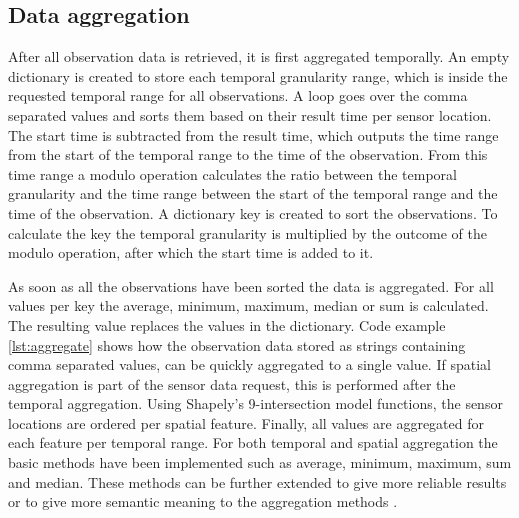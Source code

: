 \subsection{Data aggregation}
After all observation data is retrieved, it is first aggregated temporally. An empty dictionary is created to store each temporal granularity range, which is inside the requested temporal range for all observations. A loop goes over the comma separated values and sorts them based on their result time per sensor location. The start time is subtracted from the result time, which outputs the time range from the start of the temporal range to the time of the observation. From this time range a modulo operation calculates the ratio between the temporal granularity and the time range between the start of the temporal range and the time of the observation. A dictionary key is created to sort the observations. To calculate the key the temporal granularity is multiplied by the outcome of the modulo operation, after which the start time is added to it. 

As soon as all the observations have been sorted the data is aggregated. For all values per key the average, minimum, maximum, median or sum is calculated. The resulting value replaces the values in the dictionary. Code example \ref{lst:aggregate} shows how the observation data stored as strings containing comma separated values, can be quickly aggregated to a single value. If spatial aggregation is part of the sensor data request, this is performed after the temporal aggregation. Using Shapely's 9-intersection model functions, the sensor locations are ordered per spatial feature. Finally, all values are aggregated for each feature per temporal range. For both temporal and spatial aggregation the basic methods have been implemented such as average, minimum, maximum, sum and median. These methods can be further extended to give more reliable results \citep{SW:Ganesan} or to give more semantic meaning to the aggregation methods \citep{SSW:Stasch4}.         


